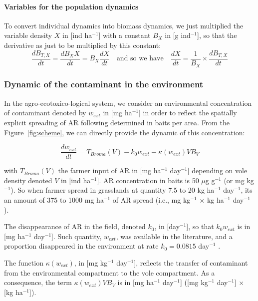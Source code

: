 \documentclass[11pt]{article}
\begin{document}
\paragraph{Variables for the population dynamics}
%
To convert individual dynamics into biomass dynamics, we just multiplied the variable density $X$ in [ind ha$^{-1}$] with a constant $B_X$ in [g ind$^{-1}$], so that the derivative as just to be multiplied by this constant: 
%
\begin{equation}
\frac{d B_{T,X}}{dt} = \frac{d B_X X}{dt} = B_X \frac{d X}{dt} \quad \text{and so we have} \quad  \frac{d X}{dt} = \frac{1}{B_X} \times \frac{d B_{T,X}}{dt}
\label{eq:biomTOpop}
\end{equation}
%

\subsubsection{Dynamic of the contaminant in the environment}

In the agro-ecotoxico-logical system, we consider an environmental concentration of contaminant denoted by $w_{ext}$ in [mg ha$^{-1}$] in order to reflect the spatially explicit spreading of AR following determined in baits per area.
%
From the Figure~\ref{fig:scheme}, we can directly provide the dynamic of this concentration:


\begin{equation}
\frac{dw_{ext}}{dt} = T_{Broma}(V) - k_0w_{ext} - \kappa(w_{ext})V B_V
\end{equation}

with $T_{Broma}(V)$ the farmer input of AR in [mg ha$^{-1}$ day$^{-1}$] depending on vole density denoted $V$ in [ind ha$^{-1}$].
%
AR concentration in baits is 50 $\mu$g g$^{-1}$ (or mg kg$^{-1}$). So when farmer spread in grasslands at quantity 7.5 to 20 kg ha$^{-1}$ day$^{-1}$, its an amount of 375 to 1000 mg ha$^{-1}$ of AR spread (i.e., mg kg$^{-1}$ $\times$ kg ha$^{-1}$ day$^{-1}$ ).


The disappearance of AR in the field, denoted $k_0$, in [day$^{-1}$], so that $k_0 w_{ext}$ is in [mg ha$^{-1}$ day$^{-1}$].
%
Such quantity, $w_{ext}$, was available in the literature, and a proportion disappeared in the environment at rate $k_0 = 0.0815$ day$^{-1}$ \citep{Sage2008}.


The function $\kappa(w_{ext})$, in [mg kg$^{-1}$ day$^{-1}$], reflects the transfer of contaminant from the environmental compartment to the vole compartment. As a consequence, the term $\kappa(w_{ext})V B_V$ is in [mg ha$^{-1}$ day$^{-1}$] ([mg kg$^{-1}$ day$^{-1}$] $\times$ [kg ha$^{-1}$]).
\end{document}
